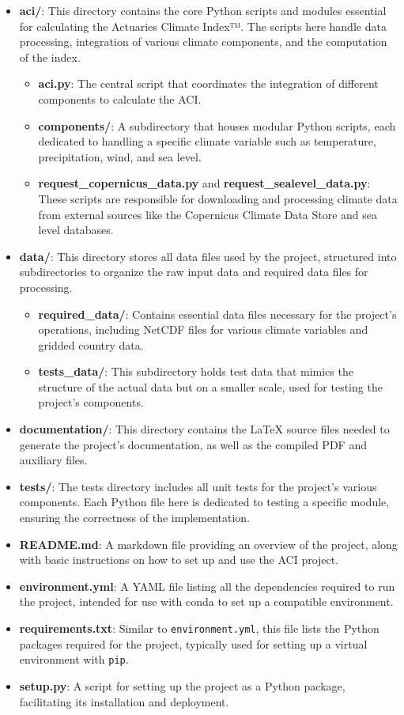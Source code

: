 \documentclass[a4paper,12pt]{article}
\begin{document}
\begin{itemize}
    \item \textbf{aci/}: This directory contains the core Python scripts and modules essential for calculating the Actuaries Climate Index™. The scripts here handle data processing, integration of various climate components, and the computation of the index.
    \begin{itemize}
        \item \textbf{aci.py}: The central script that coordinates the integration of different components to calculate the ACI.
        \item \textbf{components/}: A subdirectory that houses modular Python scripts, each dedicated to handling a specific climate variable such as temperature, precipitation, wind, and sea level.
        \item \textbf{request\_copernicus\_data.py} and \textbf{request\_sealevel\_data.py}: These scripts are responsible for downloading and processing climate data from external sources like the Copernicus Climate Data Store and sea level databases.
    \end{itemize}
    \item \textbf{data/}: This directory stores all data files used by the project, structured into subdirectories to organize the raw input data and required data files for processing.
    \begin{itemize}
        \item \textbf{required\_data/}: Contains essential data files necessary for the project's operations, including NetCDF files for various climate variables and gridded country data.
        \item \textbf{tests\_data/}: This subdirectory holds test data that mimics the structure of the actual data but on a smaller scale, used for testing the project's components.
    \end{itemize}
    \item \textbf{documentation/}: This directory contains the LaTeX source files needed to generate the project's documentation, as well as the compiled PDF and auxiliary files.
    \item \textbf{tests/}: The tests directory includes all unit tests for the project’s various components. Each Python file here is dedicated to testing a specific module, ensuring the correctness of the implementation.
    \item \textbf{README.md}: A markdown file providing an overview of the project, along with basic instructions on how to set up and use the ACI project.
    \item \textbf{environment.yml}: A YAML file listing all the dependencies required to run the project, intended for use with conda to set up a compatible environment.
    \item \textbf{requirements.txt}: Similar to \texttt{environment.yml}, this file lists the Python packages required for the project, typically used for setting up a virtual environment with \texttt{pip}.
    \item \textbf{setup.py}: A script for setting up the project as a Python package, facilitating its installation and deployment.
\end{itemize}
\end{document}
